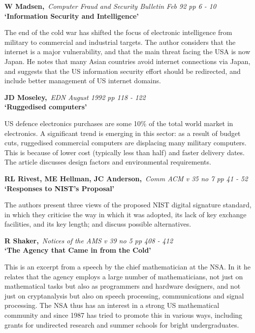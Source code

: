 {\bf \noindent W Madsen,}{\em ~Computer Fraud and Security Bulletin Feb 92
pp 6 - 10\\}
{\bf `Information Security and Intelligence'}

The end of the cold war has shifted the focus of electronic intelligence
from military to commercial and industrial targets. The author considers
that the internet is a major vulnerability, and that the main threat facing
the USA is now Japan. He notes that many Asian countries avoid internet
connections via Japan, and suggests that the US information security effort
should be redirected, and include better management of US internet domains.

\pagebreak

{\bf \noindent JD Moseley,}{\em ~EDN August 1992 pp 118 - 122\\}
{\bf `Ruggedised computers'}

US defence electronics purchases are some 10\% of the total world market in 
electronics. A significant trend is emerging in this sector: as a result of 
budget cuts, ruggedised commercial computers are displacing many military 
computers. This is because of lower cost (typically less than half) and 
faster delivery dates. The article discusses design factors and environmental
requirements.

{\bf \noindent RL Rivest, ME Hellman, JC Anderson,}{\em ~Comm ACM v 35 no 7 
pp 41 - 52\\}
{\bf `Responses to NIST's Proposal'}

The authors present three views of the proposed NIST digital signature
standard, in which they criticise the way in which it was adopted, its 
lack of key exchange facilities, and its key length; and discuss possible
alternatives.

{\bf \noindent R Shaker,}{\em ~Notices of the AMS v 39 no 5 pp 408 - 412\\}
{\bf `The Agency that Came in from the Cold'}

This is an excerpt from a speech by the chief mathematician at the NSA. In
it he relates that the agency employs a large number of mathematicians, not
just on mathematical tasks but also as programmers and hardware designers, 
and not just on cryptanalysis but also on speech processing, communications
and signal processing. The NSA thus has an interest in a strong US mathematical
community and since 1987 has tried to promote this in various ways, including
grants for undirected research and summer schools for bright undergraduates.




